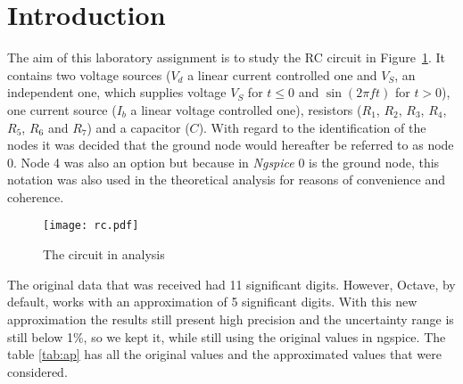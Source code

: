 \section{Introduction}
\label{sec:introduction}


The aim of this laboratory assignment is to study the RC circuit in Figure~\ref{fig:rc}. It contains two voltage sources ($V_d$ a linear current controlled one and $V_S$, an independent one, which supplies voltage $V_S$ for $t\leq0$ and $\sin (2 \pi f t)$ for $t>0$), one current source ($I_b$ a linear voltage controlled one), resistors ($R_1$, $R_2$, $R_3$, $R_4$, $R_5$, $R_6$ and $R_7$) and a capacitor ($C$).
With regard to the identification of the nodes it was decided that the ground node would hereafter be referred to as node 0. Node 4 was also an option but because in \textit{Ngspice} 0 is the ground node, this notation was also used in the theoretical analysis for reasons of convenience and coherence.


\begin{figure}[h] \centering
\texttt{[image: rc.pdf]}
\caption{The circuit in analysis}
\label{fig:rc}
\end{figure}





The original data that was received had 11 significant digits. However, Octave, by default, works with an approximation of 5 significant digits. With this new approximation the results still present high precision and the uncertainty range is still below 1\%, so we kept it, while still using the original values in ngspice. The table \ref{tab:ap} has all the original values and the approximated values that were considered. 

